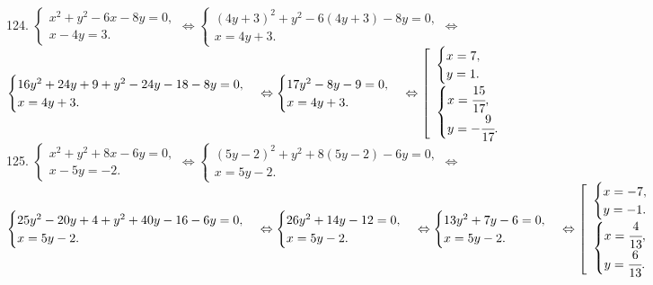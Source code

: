 124. $\begin{cases} x^2+y^2-6x-8y=0,\\ x-4y=3.\end{cases}\Leftrightarrow
\begin{cases} (4y+3)^2+y^2-6(4y+3)-8y=0,\\ x=4y+3.\end{cases}\Leftrightarrow$\\$
\begin{cases} 16y^2+24y+9+y^2-24y-18-8y=0,\\ x=4y+3.\end{cases}\Leftrightarrow
\begin{cases} 17y^2-8y-9=0,\\ x=4y+3.\end{cases}\Leftrightarrow
\left[\begin{array}{l}\begin{cases}x=7,\\y=1.\end{cases}\\
\begin{cases}x=\cfrac{15}{17},\\y=-\cfrac{9}{17}.\end{cases}\end{array}\right.$\\
125. $\begin{cases} x^2+y^2+8x-6y=0,\\ x-5y=-2.\end{cases}\Leftrightarrow
\begin{cases} (5y-2)^2+y^2+8(5y-2)-6y=0,\\ x=5y-2.\end{cases}\Leftrightarrow$\\$
\begin{cases} 25y^2-20y+4+y^2+40y-16-6y=0,\\ x=5y-2.\end{cases}\Leftrightarrow
\begin{cases} 26y^2+14y-12=0,\\ x=5y-2.\end{cases}\Leftrightarrow
\begin{cases} 13y^2+7y-6=0,\\ x=5y-2.\end{cases}\Leftrightarrow
\left[\begin{array}{l}\begin{cases}x=-7,\\y=-1.\end{cases}\\
\begin{cases}x=\cfrac{4}{13},\\y=\cfrac{6}{13}.\end{cases}\end{array}\right.$
\newpage
